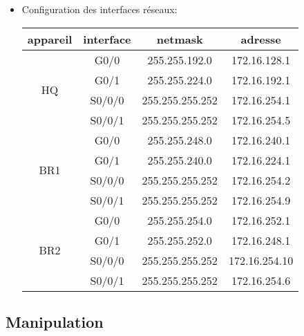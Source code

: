 \documentclass[a4paper]{article}
\begin{document}
\begin{itemize}
\item Configuration des interfaces réseaux:
\begin{center}
    \begin{tabular}{|c|c|c|c|} \hline
        appareil & interface & netmask & adresse \\ \hline

        \multirow{4}{*}{HQ}
        & G0/0 & 255.255.192.0 & 172.16.128.1 \\
        & G0/1 & 255.255.224.0 & 172.16.192.1 \\
        & S0/0/0 & 255.255.255.252 & 172.16.254.1 \\
        & S0/0/1 & 255.255.255.252 & 172.16.254.5 \\ \hline

        \multirow{4}{*}{BR1}
        & G0/0 & 255.255.248.0 & 172.16.240.1 \\
        & G0/1 & 255.255.240.0 & 172.16.224.1 \\
        & S0/0/0 & 255.255.255.252 & 172.16.254.2 \\
        & S0/0/1 & 255.255.255.252 & 172.16.254.9 \\ \hline

        \multirow{4}{*}{BR2}
        & G0/0 & 255.255.254.0 & 172.16.252.1 \\
        & G0/1 & 255.255.252.0 & 172.16.248.1 \\
        & S0/0/0 & 255.255.255.252 & 172.16.254.10 \\
        & S0/0/1 & 255.255.255.252 & 172.16.254.6 \\ \hline
    \end{tabular}
\end{center}





\end{itemize}










\subsection{Manipulation}
\end{document}
